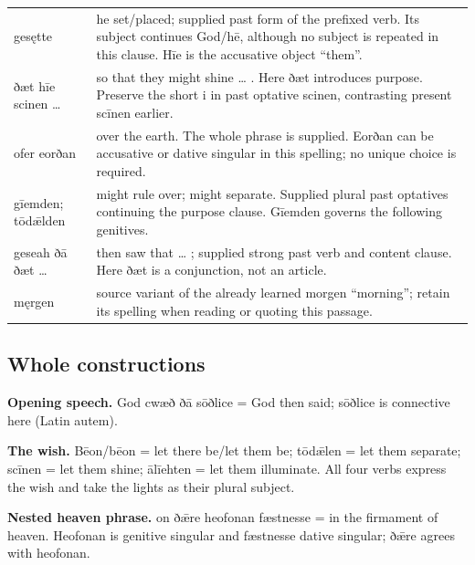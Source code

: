\begin{tabular}{@{}>{\raggedright\arraybackslash}p{29.38mm}>{\raggedright\arraybackslash}p{91.81mm}@{}}
gesętte & he set/\allowbreak{}placed; supplied past form of the prefixed verb. Its subject continues God/\allowbreak{}hē, although no subject is repeated in this clause. Hīe is the accusative object “them”. \\
ðæt hīe scinen … & so that they might shine … . Here ðæt introduces purpose. Preserve the short i in past optative scinen, contrasting present scīnen earlier. \\
ofer eorðan & over the earth. The whole phrase is supplied. Eorðan can be accusative or dative singular in this spelling; no unique choice is required. \\
gīemden; tōdǣlden & might rule over; might separate. Supplied plural past optatives continuing the purpose clause. Gīemden governs the following genitives. \\
geseah ðā ðæt … & then saw that … ; supplied strong past verb and content clause. Here ðæt is a conjunction, not an article. \\
męrgen & source variant of the already learned morgen “morning”; retain its spelling when reading or quoting this passage. \\
\bottomrule
\end{tabular}
\par\endgroup

\subsection*{Whole constructions}

\textbf{Opening speech.} God cwæð ðā sōðlice = God then said; sōðlice is connective here (Latin autem).

\textbf{The wish.} Bēon/\allowbreak{}bēon = let there be/\allowbreak{}let them be; tōdǣlen = let them separate; scīnen = let them shine; ālīehten = let them illuminate. All four verbs express the wish and take the lights as their plural subject.

\textbf{Nested heaven phrase.} on ðǣre heofonan fæstnesse = in the firmament of heaven. Heofonan is genitive singular and fæstnesse dative singular; ðǣre agrees with heofonan.

